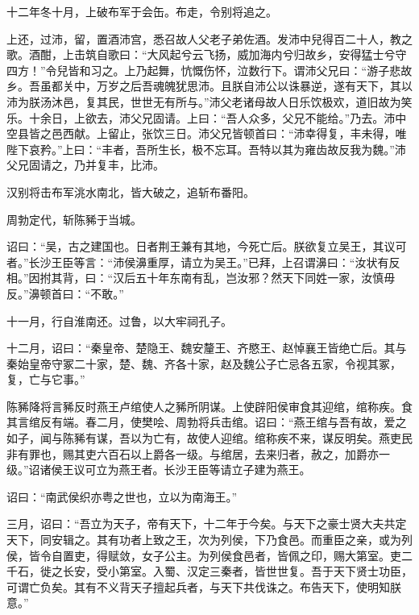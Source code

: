 \documentclass[12pt,UTF8]{ctexbook}
\begin{document}
十二年冬十月，上破布军于会缶。布走，令别将追之。



上还，过沛，留，置酒沛宫，悉召故人父老子弟佐酒。发沛中兒得百二十人，教之歌。酒酣，上击筑自歌曰：“大风起兮云飞扬，威加海内兮归故乡，安得猛士兮守四方！”令兒皆和习之。上乃起舞，忼慨伤怀，泣数行下。谓沛父兄曰：“游子悲故乡。吾虽都关中，万岁之后吾魂魄犹思沛。且朕自沛公以诛暴逆，遂有天下，其以沛为朕汤沐邑，复其民，世世无有所与。”沛父老诸母故人日乐饮极欢，道旧故为笑乐。十余日，上欲去，沛父兄固请。上曰：“吾人众多，父兄不能给。”乃去。沛中空县皆之邑西献。上留止，张饮三日。沛父兄皆顿首曰：“沛幸得复，丰未得，唯陛下哀矜。”上曰：“丰者，吾所生长，极不忘耳。吾特以其为雍齿故反我为魏。”沛父兄固请之，乃并复丰，比沛。



汉别将击布军洮水南北，皆大破之，追斩布番阳。



周勃定代，斩陈豨于当城。



诏曰：“吴，古之建国也。日者荆王兼有其地，今死亡后。朕欲复立吴王，其议可者。”长沙王臣等言：“沛侯濞重厚，请立为吴王。”已拜，上召谓濞曰：“汝状有反相。”因拊其背，曰：“汉后五十年东南有乱，岂汝邪？然天下同姓一家，汝慎毋反。”濞顿首曰：“不敢。”



十一月，行自淮南还。过鲁，以大牢祠孔子。



十二月，诏曰：“秦皇帝、楚隐王、魏安釐王、齐愍王、赵悼襄王皆绝亡后。其与秦始皇帝守冢二十家，楚、魏、齐各十家，赵及魏公子亡忌各五家，令视其冢，复，亡与它事。”



陈豨降将言豨反时燕王卢绾使人之豨所阴谋。上使辟阳侯审食其迎绾，绾称疾。食其言绾反有端。春二月，使樊哙、周勃将兵击绾。诏曰：“燕王绾与吾有故，爱之如子，闻与陈豨有谋，吾以为亡有，故使人迎绾。绾称疾不来，谋反明矣。燕吏民非有罪也，赐其吏六百石以上爵各一级。与绾居，去来归者，赦之，加爵亦一级。”诏诸侯王议可立为燕王者。长沙王臣等请立子建为燕王。



诏曰：“南武侯织亦粤之世也，立以为南海王。”



三月，诏曰：“吾立为天子，帝有天下，十二年于今矣。与天下之豪士贤大夫共定天下，同安辑之。其有功者上致之王，次为列侯，下乃食邑。而重臣之亲，或为列侯，皆令自置吏，得赋敛，女子公主。为列侯食邑者，皆佩之印，赐大第室。吏二千石，徙之长安，受小第室。入蜀、汉定三秦者，皆世世复。吾于天下贤士功臣，可谓亡负矣。其有不义背天子擅起兵者，与天下共伐诛之。布告天下，使明知朕意。”
\end{document}
